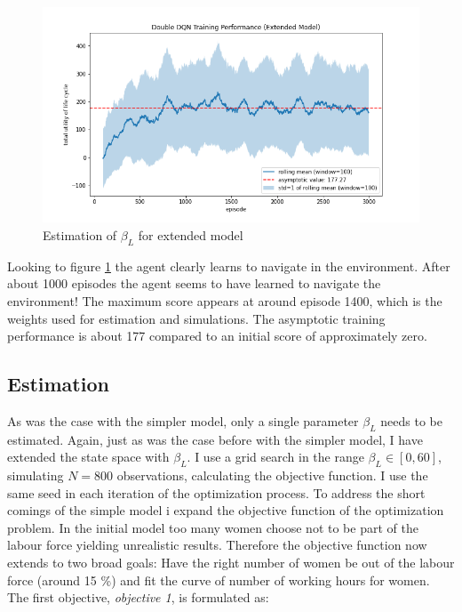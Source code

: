 \begin{figure}[ht]
    \centering
    \includegraphics[scale=0.4]{figures/ddqn_extended_model_training_performance.png}
    \caption{Estimation of $\beta_L$ for extended model}
    \label{fig:training_extended}
\end{figure}

Looking to figure \ref{fig:training_extended} the agent clearly learns to navigate in the environment. After about 1000 episodes the agent seems to have learned to navigate the environment! The maximum score appears at around episode 1400, which is the weights used for estimation and simulations. The asymptotic training performance is about 177 compared to an initial score of approximately zero.

\subsection{Estimation}

As was the case with the simpler model, only a single parameter $\beta_L$ needs to be estimated. Again, just as was the case before with the simpler model, I have extended the state space with $\beta_L$. I use a grid search in the range $\beta_L \in [0, 60]$, simulating $N=800$ observations, calculating the objective function. I use the same seed in each iteration of the optimization process. To address the short comings of the simple model i expand the objective function of the optimization problem. In the initial model too many women choose not to be part of the labour force yielding unrealistic results. Therefore the objective function now extends to two broad goals: Have the right number of women be out of the labour force (around 15 \%) and fit the curve of number of working hours for women. The first objective, \textit{objective 1}, is formulated as: 

